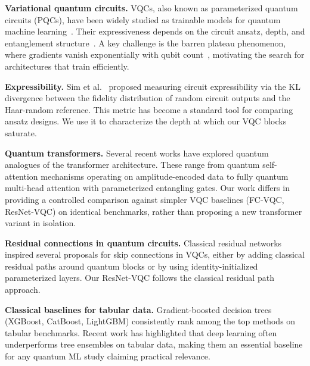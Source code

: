 
\textbf{Variational quantum circuits.}
VQCs, also known as parameterized quantum circuits (PQCs), have been widely
studied as trainable models for quantum machine
learning~\cite{cerezo2021variational,benedetti2019parameterized}.  Their
expressiveness depends on the circuit ansatz, depth, and entanglement
structure~\cite{schuld2021effect}.  A key challenge is the barren plateau
phenomenon, where gradients vanish exponentially with qubit
count~\cite{mcclean2018barren}, motivating the search for architectures
that train efficiently.

\textbf{Expressibility.}
Sim et al.~\cite{sim2019expressibility} proposed measuring circuit
expressibility via the KL divergence between the fidelity distribution of
random circuit outputs and the Haar-random reference.  This metric has
become a standard tool for comparing ansatz designs.  We use it to
characterize the depth at which our VQC blocks saturate.

\textbf{Quantum transformers.}
Several recent works have explored quantum analogues of the transformer
architecture.  These range from quantum self-attention mechanisms operating
on amplitude-encoded data to fully quantum multi-head attention with
parameterized entangling gates.  Our work differs in providing a controlled
comparison against simpler VQC baselines (FC-VQC, ResNet-VQC) on identical
benchmarks, rather than proposing a new transformer variant in isolation.

\textbf{Residual connections in quantum circuits.}
Classical residual networks~\cite{he2016deep} inspired several proposals
for skip connections in VQCs, either by adding classical residual paths
around quantum blocks or by using identity-initialized parameterized layers.
Our ResNet-VQC follows the classical residual path approach.

\textbf{Classical baselines for tabular data.}
Gradient-boosted decision trees (XGBoost, CatBoost, LightGBM) consistently
rank among the top methods on tabular benchmarks.  Recent work has
highlighted that deep learning often underperforms tree ensembles on
tabular data, making them an essential baseline for any quantum ML study
claiming practical relevance.
